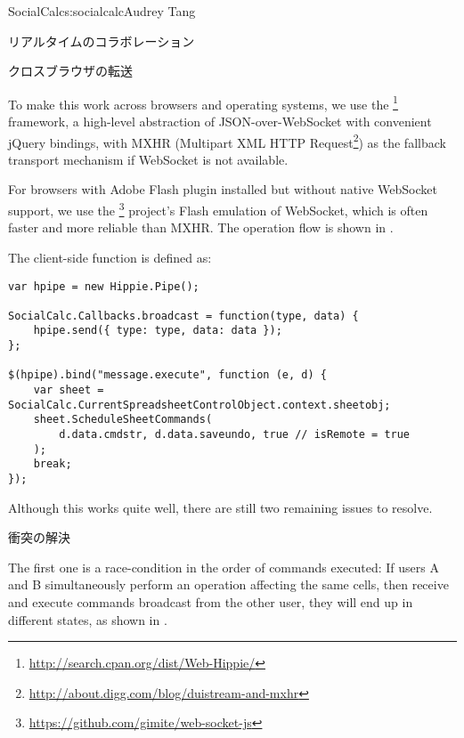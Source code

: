 \begin{aosachapter}{SocialCalc}{s:socialcalc}{Audrey Tang}
\begin{aosasect1}{リアルタイムのコラボレーション}
\begin{aosasect2}{クロスブラウザの転送}

To make this work across browsers and operating systems, we use the
\footnote{\url{http://search.cpan.org/dist/Web-Hippie/}}
framework, a high-level abstraction of JSON-over-WebSocket with
convenient jQuery bindings, with MXHR (Multipart XML HTTP
Request\footnote{\url{http://about.digg.com/blog/duistream-and-mxhr}})
as the fallback transport mechanism if WebSocket is not available.

For browsers with Adobe Flash plugin installed but without native
WebSocket support, we use the
\footnote{\url{https://github.com/gimite/web-socket-js}}
project's Flash emulation of WebSocket, which is often faster and more reliable
than MXHR.  The operation flow is shown in .


\pagebreak

The client-side  function is
defined as:

\begin{verbatim}
var hpipe = new Hippie.Pipe();

SocialCalc.Callbacks.broadcast = function(type, data) {
    hpipe.send({ type: type, data: data });
};

$(hpipe).bind("message.execute", function (e, d) {
    var sheet = SocialCalc.CurrentSpreadsheetControlObject.context.sheetobj;
    sheet.ScheduleSheetCommands(
        d.data.cmdstr, d.data.saveundo, true // isRemote = true
    );
    break;
});
\end{verbatim}

\noindent Although this works quite well, there are still two remaining issues
to resolve.

\end{aosasect2}

\begin{aosasect2}{衝突の解決}

The first one is a race-condition in the order of commands executed:
If users A and B simultaneously perform an operation affecting the
same cells, then receive and execute commands broadcast from the other
user, they will end up in different states, as shown in
.


\end{aosasect2}
\end{aosasect1}
\end{aosachapter}
